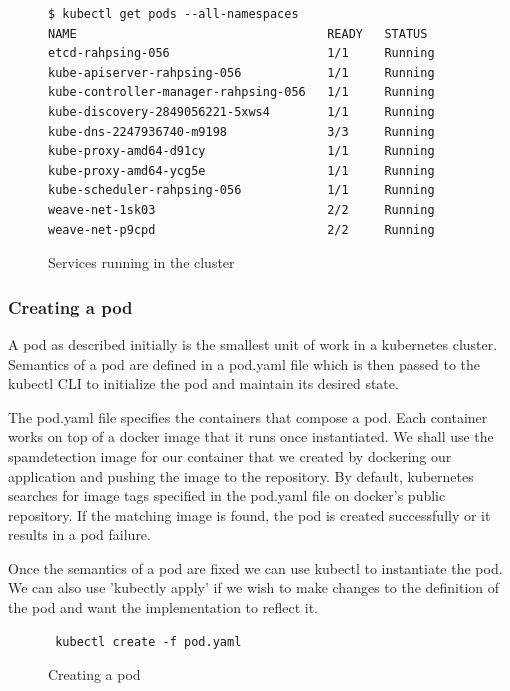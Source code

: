 \documentclass[9pt,twocolumn,twoside]{../../styles/osajnl}
\begin{document}
\begin{figure}[H]
\begin{verbatim}
$ kubectl get pods --all-namespaces
NAME                                   READY   STATUS       
etcd-rahpsing-056                      1/1     Running          
kube-apiserver-rahpsing-056            1/1     Running           
kube-controller-manager-rahpsing-056   1/1     Running           
kube-discovery-2849056221-5xws4        1/1     Running         
kube-dns-2247936740-m9198              3/3     Running           
kube-proxy-amd64-d91cy                 1/1     Running           
kube-proxy-amd64-ycg5e                 1/1     Running           
kube-scheduler-rahpsing-056            1/1     Running           
weave-net-1sk03                        2/2     Running           
weave-net-p9cpd                        2/2     Running           
\end{verbatim}
\caption{Services running in the cluster}
\label{Services running in the cluster}
\end{figure}

\subsubsection{Creating a pod}
A pod as described initially is the smallest unit of work in a
kubernetes cluster. Semantics of a pod are defined in a pod.yaml file
which is then passed to the kubectl CLI to initialize the pod and
maintain its desired state.

\noindent
The pod.yaml file specifies the containers that compose a pod. Each
container works on top of a docker image that it runs once
instantiated. We shall use the spamdetection image for our container
that we created by dockering our application and pushing the image to
the repository. By default, kubernetes searches for image tags
specified in the pod.yaml file on docker's public repository. If the
matching image is found, the pod is created successfully or it results
in a pod failure.

\noindent
Once the semantics of a pod are fixed we can use kubectl to
instantiate the pod. We can also use 'kubectly apply' if we wish to
make changes to the definition of the pod and want the implementation
to reflect it.


\begin{figure}
\begin{verbatim}
 kubectl create -f pod.yaml
\end{verbatim}
\caption{Creating a pod}
\label{Creating a pod}
\end{figure}
\end{document}
